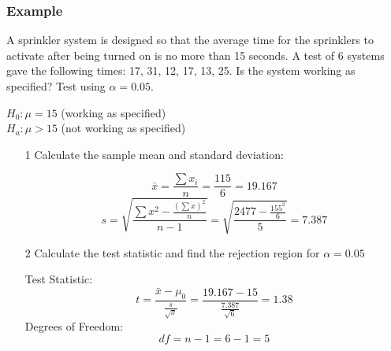 \documentclass[12pt, letterpaper]{article}
\begin{document}
            \subsubsection*{Example}
                A sprinkler system is designed so that the average time for the sprinklers to activate after being turned on is no more than 15 seconds. A test of 6 systems gave the following times:
                17, 31, 12, 17, 13, 25. Is the system working as specified? Test using $\alpha = 0.05$.
                \begin{mdframed}[leftmargin=0.5cm, rightmargin=0.5cm]
                    $H_0: \mu = 15$ (working as specified) \\
                    $H_a: \mu > 15$ (not working as specified)
                \end{mdframed}
                \begin{itemize}
                    \item[1] Calculate the sample mean and standard deviation:
                    \begin{mdframed}[leftmargin=0.5cm, rightmargin=0.5cm]
                       \begin{equation*}
                           \bar{x} = \frac{\sum x_i}{n} = \frac{115}{6} = 19.167
                        \end{equation*} 
                        \begin{equation*}
                            s = \sqrt{\frac{\sum x^2 - \frac{(\sum x)^2}{n}}{n-1}} = \sqrt{\frac{2477 - \frac{155^2}{6}}{5}} = 7.387
                        \end{equation*}
                    \end{mdframed}
                    \item[2] Calculate the test statistic and find the rejection region for $\alpha = 0.05$
                    \begin{mdframed}[leftmargin=0.5cm, rightmargin=0.5cm]
                        \begin{center}
                            Test Statistic:
                            \begin{equation*}
                                t = \frac{\bar{x}-\mu_0}{\frac{s}{\sqrt{x}}} = \frac{19.167 - 15}{\frac{7.387}{\sqrt{6}}} = 1.38
                            \end{equation*}
                            Degrees of Freedom:
                            \begin{equation*}
                                df = n - 1 = 6 - 1 = 5

\end{equation*}
\end{center}
\end{mdframed}
\end{itemize}
\end{document}
